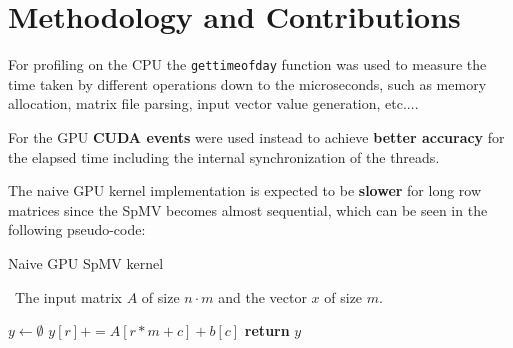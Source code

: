 \documentclass[conference]{IEEEtran}
\begin{document}
    \section{Methodology and Contributions}\label{sec:methodology}

    For profiling on the CPU the \texttt{gettimeofday} function was used to
    measure the time taken by different operations down to the microseconds,
    such as memory allocation, matrix file parsing, input vector value generation,
    etc....

    For the GPU \textbf{CUDA events} were used instead to achieve
    \textbf{better accuracy} for the elapsed time including the internal
    synchronization of the threads.

    The naive GPU kernel implementation is expected to be \textbf{slower} for
    long row matrices since the SpMV becomes almost sequential, which can be
    seen in the following pseudo-code:
    \begin{algorithm}[h!]
        \caption{Naive GPU SpMV kernel}
        \algorithmicrequire~The input matrix $A$ of size $n \cdot m$ and the vector $x$ of size $m$.
        \begin{algorithmic}[1]
                \State $y \gets \emptyset$
                        \State $y[r] += A[r * m + c] + b[c]$
                    \EndFor
                \EndFor
                \State \textbf{return} $y$
            \EndProcedure
        \end{algorithmic}
        \label{alg:SpMVrow}
    \end{algorithm}
\end{document}
